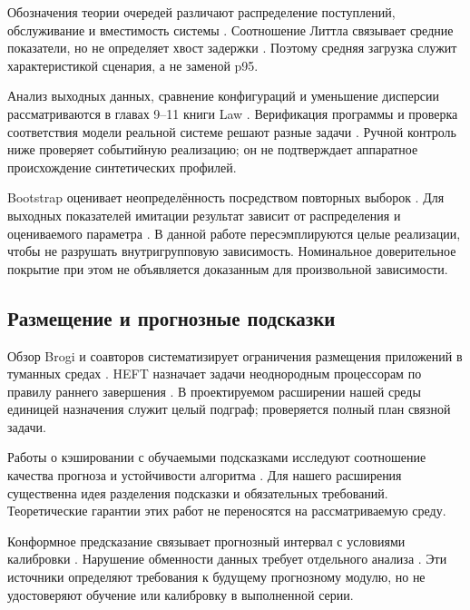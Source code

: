 Обозначения теории очередей различают распределение поступлений, обслуживание и вместимость системы \cite{kendall}. Соотношение Литтла связывает средние показатели, но не определяет хвост задержки \cite{little}. Поэтому средняя загрузка служит характеристикой сценария, а не заменой p95.

Анализ выходных данных, сравнение конфигураций и уменьшение дисперсии рассматриваются в главах 9--11 книги Law \cite{law}. Верификация программы и проверка соответствия модели реальной системе решают разные задачи \cite{sargent}. Ручной контроль ниже проверяет событийную реализацию; он не подтверждает аппаратное происхождение синтетических профилей.

Bootstrap оценивает неопределённость посредством повторных выборок \cite{efron}. Для выходных показателей имитации результат зависит от распределения и оцениваемого параметра \cite{barton}. В данной работе пересэмплируются целые реализации, чтобы не разрушать внутригрупповую зависимость. Номинальное доверительное покрытие при этом не объявляется доказанным для произвольной зависимости.

\hypertarget{ux440ux430ux437ux43cux435ux449ux435ux43dux438ux435-ux438-ux43fux440ux43eux433ux43dux43eux437ux43dux44bux435-ux43fux43eux434ux441ux43aux430ux437ux43aux438}{%
\subsection{Размещение и прогнозные подсказки}}

Обзор Brogi и соавторов систематизирует ограничения размещения приложений в туманных средах \cite{fogsurvey}. HEFT назначает задачи неоднородным процессорам по правилу раннего завершения \cite{heft}. В проектируемом расширении нашей среды единицей назначения служит целый подграф; проверяется полный план связной задачи.

Работы о кэшировании с обучаемыми подсказками исследуют соотношение качества прогноза и устойчивости алгоритма \cite{lykouris18,lykouris21,advice}. Для нашего расширения существенна идея разделения подсказки и обязательных требований. Теоретические гарантии этих работ не переносятся на рассматриваемую среду.

Конформное предсказание связывает прогнозный интервал с условиями калибровки \cite{angelopoulos}. Нарушение обменности данных требует отдельного анализа \cite{barber}. Эти источники определяют требования к будущему прогнозному модулю, но не удостоверяют обучение или калибровку в выполненной серии.

